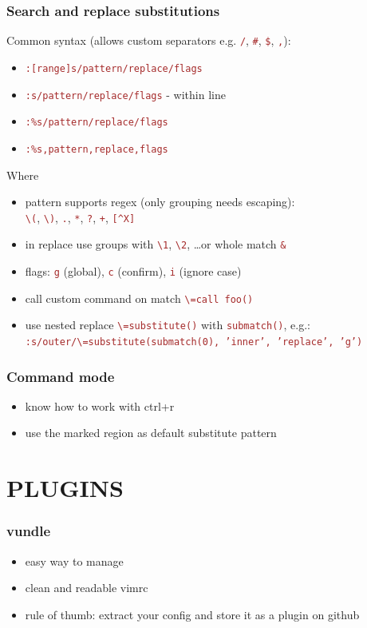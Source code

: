 \documentclass{beamer}
\newcommand{\vimcommand}[1]{\texttt{\textcolor{brown}{#1}}}
\begin{document}
\begin{frame}
    \frametitle{Search and replace substitutions}
    Common syntax (allows custom separators e.g. \vimcommand{/}, \vimcommand{\#}, \vimcommand{\$}, \vimcommand{,}):
    {\footnotesize 
    \begin{itemize}
        \item \vimcommand{:[range]s/pattern/replace/flags}
        \item \vimcommand{:s/pattern/replace/flags} - within line
        \item \vimcommand{:\%s/pattern/replace/flags}
        \item \vimcommand{:\%s,pattern,replace,flags}
    \end{itemize}
    }
    Where
    \begin{itemize}
        \item pattern supports regex (only grouping needs escaping):\\
          \vimcommand{\textbackslash{(}}, \vimcommand{\textbackslash{)}}, \vimcommand{.}, \vimcommand{*}, \vimcommand{?}, \vimcommand{+}, \vimcommand{[\string^X]}
        \item in replace use groups with \vimcommand{\textbackslash{1}}, \vimcommand{\textbackslash{2}}, \ldots or whole match \vimcommand{\&}
        \item flags: \vimcommand{g} (global), \vimcommand{c} (confirm), \vimcommand{i} (ignore case)
        \item call custom command on match \vimcommand{\textbackslash{=}call foo()}
        \item use nested replace \vimcommand{\textbackslash{=}substitute()} with \vimcommand{submatch()}, e.g.:
    {\footnotesize 
          \vimcommand{:s/outer/\textbackslash{=}substitute(submatch(0), 'inner', 'replace', 'g')}
    }
    \end{itemize}
\end{frame}

\begin{frame}
    \frametitle{Command mode}
    \begin{itemize}
        \item know how to work with ctrl+r
        \item use the marked region as default substitute pattern
    \end{itemize}
\end{frame}

\section{PLUGINS}
\begin{frame}
    \frametitle{vundle}
    \begin{itemize}
        \item easy way to manage
        \item clean and readable vimrc
        \item rule of thumb: extract your config and store it as a plugin on github
    \end{itemize}
\end{frame}
\end{document}
